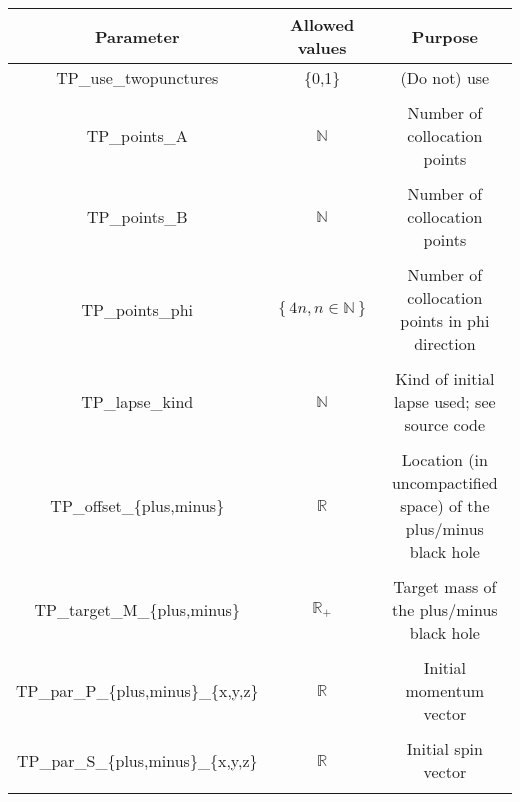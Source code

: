\documentclass{article}
\begin{document}
\begin{table}[h]
   \centering 
   \begin{tabular}{ccc}
      Parameter  & Allowed values & Purpose \\
     \midrule\midrule
      TP\_use\_twopunctures 
      & \{0,1\} & (Do not) use 
      \\ \\
      TP\_points\_A
      & $\mathbb{N}$ 
      & Number of collocation points
      \\ \\
      TP\_points\_B
      & $\mathbb{N}$ 
      & Number of collocation points
      \\ \\
      TP\_points\_phi 
      & $\left\{4n, n\in\mathbb{N}\right\}$ 
      & Number of collocation points in phi direction
      \\ \\
      TP\_lapse\_kind 
      & $\mathbb{N}$ 
      & Kind of initial lapse used; see source code 
      \\ \\
      TP\_offset\_\{plus,minus\} 
      & $\mathbb{R}$ 
      & Location (in uncompactified space) of the
      plus/minus black hole
      \\ \\
      TP\_target\_M\_\{plus,minus\} 
      & $\mathbb{R}_+$ 
      & Target mass of the plus/minus black hole
      \\ \\
      TP\_par\_P\_\{plus,minus\}\_\{x,y,z\} 
      & $\mathbb{R}$ 
      & Initial momentum vector  
      \\ \\
      TP\_par\_S\_\{plus,minus\}\_\{x,y,z\} 
      & $\mathbb{R}$ 
      & Initial spin vector 
      \\ \\
   \end{tabular}
\end{table}

\newpage
\end{document}
